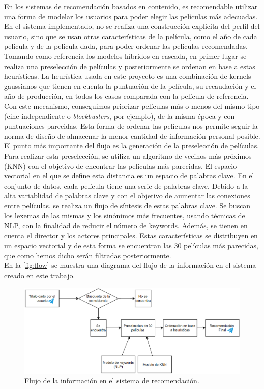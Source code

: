 En los sistemas de recomendación basados en contenido, es recomendable utilizar una forma de modelar los usuarios para poder elegir las películas más adecuadas. En el sistema implementado, no se realiza una construcción explicita del perfil del usuario, sino que se usan otras características de la película, como el año de cada película y de la película dada, para poder ordenar las películas recomendadas. Tomando como referencia los modelos híbridos en cascada, en primer lugar se realiza una preselección de películas y posteriormente se ordenan en base a estas heurísticas. La heurística usada en este proyecto es una combinación de kernels gaussianos que tienen en cuenta la puntuación de la película, su recaudación y el año de producción, en todos los casos comparada con la película de referencia. Con este mecanismo, conseguimos priorizar películas más o menos del mismo tipo (cine independiente o \textit{blockbusters}, por ejemplo), de la misma época y con puntuaciones parecidas. Esta forma de ordenar las películas nos permite seguir la norma de diseño de almacenar la menor cantidad de información personal posible.\\

El punto más importante del flujo es la generación de la preselección de películas. Para realizar esta preselección, se utiliza un algoritmo de vecinos más próximos (KNN) con el objetivo de encontrar las películas más parecidas. El espacio vectorial en el que se define esta distancia es un espacio de palabras clave. En el conjunto de datos, cada película tiene una serie de palabras clave. Debido a la alta variablidad de palabras clave y con el objetivo de aumentar las conexiones entre películas, se realiza un flujo de síntesis de estas palabras clave. Se buscan los lexemas de las mismas y los sinónimos más frecuentes, usando técnicas de NLP, con la finalidad de reducir el número de keywords. Además, se tienen en cuenta el director y los actores principales. Estas características se distribuyen en un espacio vectorial y de esta forma se encuentran las $30$ películas más parecidas, que como hemos dicho serán filtradas posteriormente.\\

En la \autoref{fig:flow} se muestra una diagrama del flujo de la información en el sistema creado en este trabajo.

\begin{figure}[h]
    \centering
    \captionsetup{width=12cm}
    \includegraphics[width=12cm]{contenido/imagenes/FLujodattos.png}
    \caption{Flujo de la información en el sistema de recomendación.}
    \label{fig:flow}
\end{figure}


